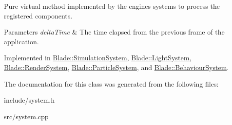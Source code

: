 Pure virtual method implemented by the engine\textquotesingle{}s systems to process the registered components. 


\begin{DoxyParams}{Parameters}
{\em delta\+Time} & The time elapsed from the previous frame of the application. \\
\hline
\end{DoxyParams}


Implemented in \hyperlink{class_blade_1_1_simulation_system_ade81487a31325272e8489c772530ccf5}{Blade\+::\+Simulation\+System}, \hyperlink{class_blade_1_1_light_system_afbad47302dca40e57322a68252cb08e7}{Blade\+::\+Light\+System}, \hyperlink{class_blade_1_1_render_system_a8edd0d0c9d5d54c395a03f98f6b16fb9}{Blade\+::\+Render\+System}, \hyperlink{class_blade_1_1_particle_system_a01e4983673061d797da072324a98d8d4}{Blade\+::\+Particle\+System}, and \hyperlink{class_blade_1_1_behaviour_system_af233e62b0ee7a43a419069d6de557343}{Blade\+::\+Behaviour\+System}.



The documentation for this class was generated from the following files\+:\begin{DoxyCompactItemize}
\item 
include/system.\+h\item 
src/system.\+cpp\end{DoxyCompactItemize}
